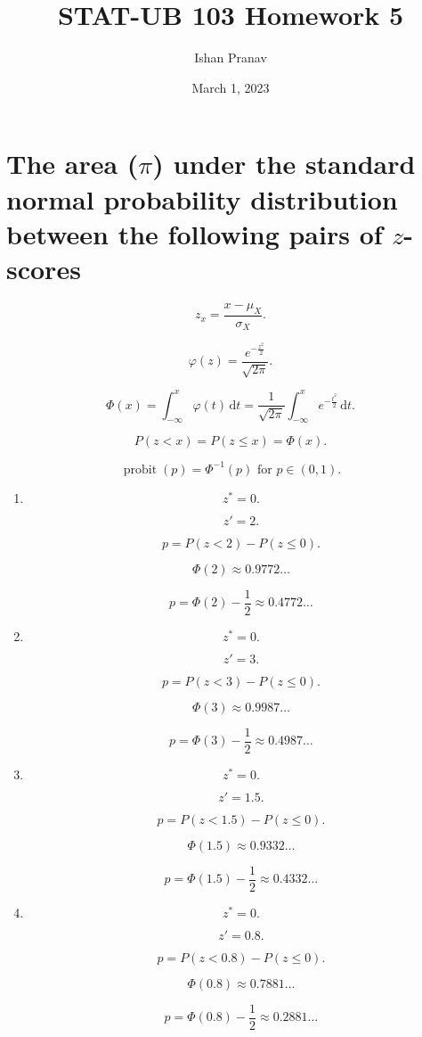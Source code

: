 \documentclass[12pt]{article}
\title{STAT-UB 103 Homework 5}
\author{Ishan Pranav}
\date{March 1, 2023}
\DeclareMathOperator{\probit}{probit}
\begin{document}
\maketitle
\section{The area ($\pi$) under the standard normal probability distribution between the following pairs of $z$-scores}
\[z_x=\frac{x-\mu_X}{\sigma_X}.\]

\[\varphi(z)=\frac{e^{-\frac{z^2}{2}}}{\sqrt{2\pi}}.\]

\[\Phi(x)=\int^x_{-\infty}{\varphi(t)\,\mathrm{d}t}=\frac{1}{\sqrt{2\pi}}\int^x_{-\infty}{e^{-\frac{t^2}{2}}\,\mathrm{d}t}.\]

\[P(z<x)=P(z\leq x)=\Phi(x).\]

\[\probit(p)=\Phi^{-1}(p)\text{ for } p\in(0,1).\]
\begin{enumerate}
\item
\[z^*=0.\]

\[z'=2.\]

\[p=P(z<2)-P(z\leq 0).\]

\[\Phi(2)\approx 0.9772\dots\]

\[p=\Phi(2)-\frac{1}{2}\approx 0.4772\dots\]
\item
\[z^*=0.\]

\[z'=3.\]

\[p=P(z<3)-P(z\leq 0).\]

\[\Phi(3)\approx 0.9987\dots\]

\[p=\Phi(3)-\frac{1}{2}\approx 0.4987\dots\]
\item
\[z^*=0.\]

\[z'=1.5.\]

\[p=P(z<1.5)-P(z\leq 0).\]

\[\Phi(1.5)\approx 0.9332\dots\]

\[p=\Phi(1.5)-\frac{1}{2}\approx 0.4332\dots\]
\item
\[z^*=0.\]

\[z'=0.8.\]

\[p=P(z<0.8)-P(z\leq 0).\]

\[\Phi(0.8)\approx 0.7881\dots\]

\[p=\Phi(0.8)-\frac{1}{2}\approx 0.2881\dots\]
\end{enumerate}
\end{document}
